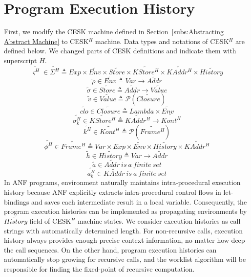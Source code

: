 \documentclass[12pt]{report}
\begin{document}
\section{Program Execution History}
\label{sub:Program Execution History}
First, we modify the CESK machine defined in Section~\ref{subs:Abstracting Abstract Machine} to CESK$^H$ machine.
Data types and notations of CESK$^H$ are defined below. We changed parts of CESK definitions and indicate them with superscript $H$.
\[
\tag{states}
\widetilde{\varsigma^H}\in\widetilde{\Sigma^H} \triangleq Exp \times \widetilde{Env} \times \widetilde{Store}
\times \widetilde{KStore^H} \times \widetilde{KAddr^H} \times \widetilde{History}
\]
\[
\tag{environments}
\tilde{\rho} \in \widetilde{Env} \triangleq Var \to \widetilde{Addr}
\]
\[
\tag{stores}
\tilde{\sigma} \in \widetilde{Store} \triangleq \widetilde{Addr} \to \widetilde{Value}
\]
\[
\tag{abstract values}
\tilde{v} \in \widetilde{Value} \triangleq \mathcal{P}(\widetilde{Closure})
\]
\[
\tag{closures}
\widetilde{clo} \in \widetilde{Closure} \triangleq Lambda \times \widetilde{Env}
\]
\[
\tag{continuation stores}
\widetilde{\sigma_k^H} \in \widetilde{KStore^H} \triangleq  \widetilde{KAddr^H} \to  \widetilde{Kont^H}
\]
\[
\tag{abstract continuations}
\widetilde{k^H} \in  \widetilde{Kont^H} \triangleq  \mathcal{P}(\widetilde{Frame^H})
\]
\[
\tag{stack frames}
\widetilde{\phi^H} \in  \widetilde{Frame^H} \triangleq Var \times Exp \times  \widetilde{Env} \times \widetilde{History} \times  \widetilde{KAddr^H}
\]
\[
\tag{histories}
\tilde{h} \in \widetilde{History} \triangleq Var \to \widetilde{Addr}
\]
\[
\tag{value addresses}
\tilde{a} \in \widetilde{Addr} \ is\ a\ finite\ set
\]
\[
\tag{continuation addresses}
\widetilde{a_k^H} \in \widetilde{KAddr} \ is\ a\ finite\ set
\]
In ANF programs, environment naturally maintains intra-procedural execution history because ANF explicitly extracts intra-procedural control flows in let-bindings and saves each intermediate result in a local variable.
Consequently, the program execution histories can be implemented as propagating environments by $\widetilde{History}$ field of CESK$^H$ machine states.
We consider execution histories as call strings with automatically determined length. For non-recursive calls, execution history always provides enough precise context information, no matter how deep the call sequences. On the other hand, program execution histories can automatically stop growing for recursive calls, and the worklist algorithm will be responsible for finding the fixed-point of recursive computation.
\end{document}
